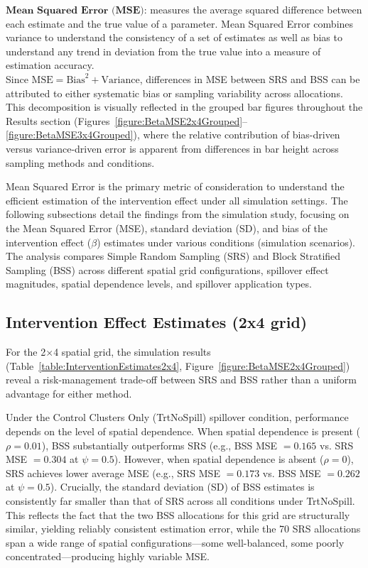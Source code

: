 \documentclass{article}[11pt]
\begin{document}
\noindent $\textbf{Mean Squared Error (MSE)}$: measures the average squared difference between each estimate and the true value of a parameter. Mean Squared Error combines variance to understand the consistency of a set of estimates as well as bias to understand any trend in deviation from the true value into a measure of estimation accuracy.\\

Since $\text{MSE} = \text{Bias}^2 + \text{Variance}$, differences in MSE between SRS and BSS can be attributed to either systematic bias or sampling variability across allocations. This decomposition is visually reflected in the grouped bar figures throughout the Results section (Figures~\ref{figure:BetaMSE2x4Grouped}--\ref{figure:BetaMSE3x4Grouped}), where the relative contribution of bias-driven versus variance-driven error is apparent from differences in bar height across sampling methods and conditions.

Mean Squared Error is the primary metric of consideration to understand the efficient estimation of the intervention effect under all simulation settings. The following subsections detail the findings from the simulation study, focusing on the Mean Squared Error (MSE), standard deviation (SD), and bias of the intervention effect ($\beta$) estimates under various conditions (simulation scenarios). The analysis compares Simple Random Sampling (SRS) and Block Stratified Sampling (BSS) across different spatial grid configurations, spillover effect magnitudes, spatial dependence levels, and spillover application types.

\subsection{Intervention Effect Estimates (2x4 grid)}

For the 2$\times$4 spatial grid, the simulation results (Table~\ref{table:InterventionEstimates2x4}, Figure~\ref{figure:BetaMSE2x4Grouped}) reveal a risk-management trade-off between SRS and BSS rather than a uniform advantage for either method.

Under the Control Clusters Only (TrtNoSpill) spillover condition, performance depends on the level of spatial dependence. When spatial dependence is present ($\rho = 0.01$), BSS substantially outperforms SRS (e.g., BSS MSE $= 0.165$ vs. SRS MSE $= 0.304$ at $\psi = 0.5$). However, when spatial dependence is absent ($\rho = 0$), SRS achieves lower average MSE (e.g., SRS MSE $= 0.173$ vs. BSS MSE $= 0.262$ at $\psi = 0.5$). Crucially, the standard deviation (SD) of BSS estimates is consistently far smaller than that of SRS across all conditions under TrtNoSpill. This reflects the fact that the two BSS allocations for this grid are structurally similar, yielding reliably consistent estimation error, while the 70 SRS allocations span a wide range of spatial configurations---some well-balanced, some poorly concentrated---producing highly variable MSE.
\end{document}
